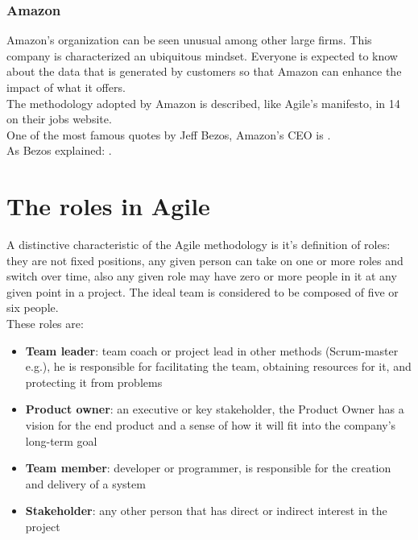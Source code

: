 	\subsubsection{Amazon}
		Amazon's organization can be seen unusual among other large firms.
		This company is characterized an ubiquitous  mindset.
		Everyone is expected to know about the data that is generated by customers so that Amazon can enhance the impact of what it offers.\\		
		The methodology adopted by Amazon is described, like Agile's manifesto, in 14  on their jobs website\cite{amazon_principles}.\\
		One of the most famous quotes by Jeff Bezos, Amazon's CEO is .\\
		As Bezos explained: \cite{how-amazon-became-agile}.

\section{The roles in Agile}
	A distinctive characteristic of the Agile methodology is it's definition of roles: they are not fixed positions, any given person can take on one or more roles and switch over time, also any given role may have zero or more people in it at any given point in a project\cite{agileRoles}.
	The ideal team is considered to be composed of five or six people.\\
	These roles are:
	\begin{itemize}
		\item \textbf{Team leader}: team coach or project lead in other methods (Scrum-master e.g.), he is responsible for facilitating the team, obtaining resources for it, and protecting it from problems
		\item \textbf{Product owner}: an executive or key stakeholder, the Product Owner has a vision for the end product and a sense of how it will fit into the company’s long-term goal
		\item \textbf{Team member}: developer or programmer, is responsible for the creation and delivery of a system
		\item \textbf{Stakeholder}: any other person that has direct or indirect interest in the project
	\end{itemize}

